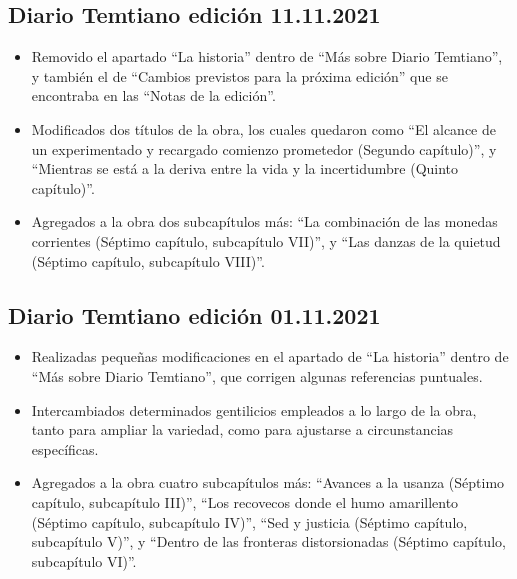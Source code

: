 \documentclass[
]{book}
\begin{document}
\hypertarget{diario-temtiano-ediciuxf3n-11.11.2021}{%
\subsection*{Diario Temtiano edición 11.11.2021}\label{diario-temtiano-ediciuxf3n-11.11.2021}}

\begin{itemize}
\item
  Removido el apartado ``La historia'' dentro de ``Más sobre Diario Temtiano'', y también el de ``Cambios previstos para la próxima edición'' que se encontraba en las ``Notas de la edición''.
\item
  Modificados dos títulos de la obra, los cuales quedaron como ``El alcance de un experimentado y recargado comienzo prometedor (Segundo capítulo)'', y ``Mientras se está a la deriva entre la vida y la incertidumbre (Quinto capítulo)''.
\item
  Agregados a la obra dos subcapítulos más: ``La combinación de las monedas corrientes (Séptimo capítulo, subcapítulo VII)'', y ``Las danzas de la quietud (Séptimo capítulo, subcapítulo VIII)''.
\end{itemize}

\hypertarget{diario-temtiano-ediciuxf3n-01.11.2021}{%
\subsection*{Diario Temtiano edición 01.11.2021}\label{diario-temtiano-ediciuxf3n-01.11.2021}}

\begin{itemize}
\item
  Realizadas pequeñas modificaciones en el apartado de ``La historia'' dentro de ``Más sobre Diario Temtiano'', que corrigen algunas referencias puntuales.
\item
  Intercambiados determinados gentilicios empleados a lo largo de la obra, tanto para ampliar la variedad, como para ajustarse a circunstancias específicas.
\item
  Agregados a la obra cuatro subcapítulos más: ``Avances a la usanza (Séptimo capítulo, subcapítulo III)'', ``Los recovecos donde el humo amarillento (Séptimo capítulo, subcapítulo IV)'', ``Sed y justicia (Séptimo capítulo, subcapítulo V)'', y ``Dentro de las fronteras distorsionadas (Séptimo capítulo, subcapítulo VI)''.
\end{itemize}
\end{document}
